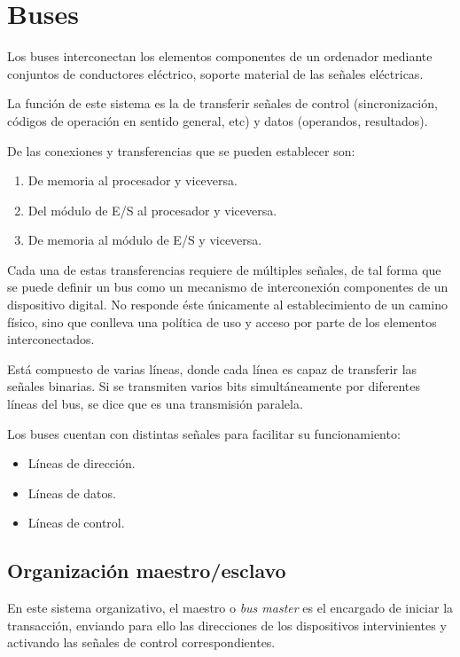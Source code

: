 \documentclass[a4paper, 11pt, titlepage]{article}
\begin{document}
\section{Buses}

    Los buses interconectan los elementos componentes de un ordenador mediante conjuntos de conductores 
    eléctrico, soporte material de las señales eléctricas.

    La función de este sistema es la de transferir señales de control (sincronización, códigos de operación 
    en sentido general, etc) y datos (operandos, resultados).

    De las conexiones y transferencias que se pueden establecer son:

    \begin{enumerate}
        \item De memoria al procesador y viceversa.
        \item Del módulo de E/S al procesador y viceversa.
        \item De memoria al módulo de E/S y viceversa.
    \end{enumerate}

    Cada una de estas transferencias requiere de múltiples señales, de tal forma que se puede definir un bus 
    como un mecanismo de interconexión componentes de un dispositivo digital. No responde éste únicamente al 
    establecimiento de un camino físico, sino que conlleva una política de uso y acceso por parte de los 
    elementos interconectados.

    Está compuesto de varias líneas, donde cada línea es capaz de transferir las señales binarias. Si se transmiten 
    varios bits simultáneamente por diferentes líneas del bus, se dice que es una transmisión paralela.

    Los buses cuentan con distintas señales para facilitar su funcionamiento:

    \begin{itemize}
        \item Líneas de dirección.
        \item Líneas de datos.
        \item Líneas de control.
    \end{itemize}

    \subsection{Organización maestro/esclavo}

        En este sistema organizativo, el maestro o \textit{bus master} es el encargado de iniciar la transacción, 
        enviando para ello las direcciones de los dispositivos intervinientes y activando las señales de control 
        correspondientes.
\end{document}

